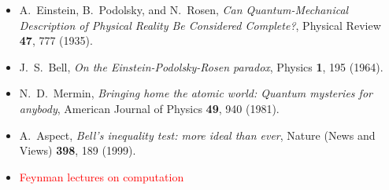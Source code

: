 \documentclass[pra,11pt]{revtex4}
\begin{document}
\begin{itemize}
\item A.~Einstein, B.~Podolsky, and N.~Rosen,
  \textit{Can Quantum-Mechanical Description of Physical Reality Be
    Considered Complete?}, Physical Review \textbf{47}, 777 (1935).
  \label{cite:epr}

\item J.~S.~Bell, \textit{On the Einstein-Podolsky-Rosen paradox},
  Physics \textbf{1}, 195 (1964). \label{cite:bell}
  
\item N.~D.~Mermin, \textit{Bringing home the atomic world: Quantum
  mysteries for anybody}, American Journal of Physics \textbf{49}, 940
  (1981). \label{cite:mermin}

\item A.~Aspect, \textit{Bell's inequality test: more ideal than ever},
  Nature (News and Views) \textbf{398}, 189 (1999). \label{cite:aspect}

\item \textcolor{red}{Feynman lectures on computation}
  \label{cite:feynman}
\end{itemize}
\end{document}
